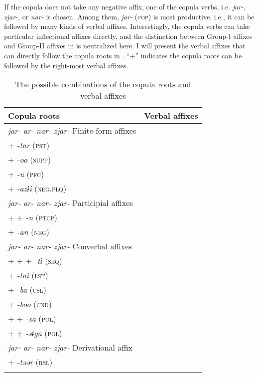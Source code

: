   If the copula does not take any negative affix, one of the copula verbs, i.e. \textit{jar-}, \textit{zjar-}, or \textit{nar-} is chosen. Among them, \textit{jar-} (\textsc{cop}) is most productive, i.e., it can be followed by many kinds of verbal affixes. Interestingly, the copula verbs can take particular inflectional affixes directly, and the distinction between Group-I affixes and Group-II affixes in  is neutralized here. I will present the verbal affixes that can directly follow the copula roots in . “+” indicates the copula roots can be followed by the right-most verbal affixes.

\begin{table}
\caption{\label{tab:key:75}The possible combinations of the copula roots and verbal affixes}
\begin{tabular}{ll}
\lsptoprule
Copula roots &  Verbal affixes\\
\midrule
\textit{jar-}  \textit{ar-}  \textit{nar-}  \textit{zjar-}  Finite-form affixes      \\
+        \textit{-tar} (\textsc{pst})                                                \\
+        \textit{-oo} (\textsc{supp})                                                \\
  +      \textit{-u} (\textsc{pfc})                                                  \\
  +      \textit{-azɨi} (\textsc{neg}.\textsc{plq})                                  \\
\textit{jar-}  \textit{ar-}  \textit{nar-}  \textit{zjar-}  Participial affixes      \\
+      +  \textit{-n} (\textsc{ptcp})                                                \\
  +      \textit{-an} (\textsc{neg})                                                 \\
\textit{jar-}  \textit{ar-}  \textit{nar-}  \textit{zjar-}  Converbal affixes        \\
+  +  +    \textit{-tɨ} (\textsc{seq})                                               \\
+        \textit{-tai} (\textsc{lst})                                                \\
+        \textit{-ba} (\textsc{csl})                                                 \\
+        \textit{-boo} (\textsc{cnd})                                                \\
+      +  \textit{-sa} (\textsc{pol})                                                \\
+      +  \textit{-sɨga} (\textsc{pol})                                              \\
\textit{jar-}  \textit{ar-}  \textit{nar-}  \textit{zjar-}  Derivational affix       \\
+        \textit{-təər} (\textsc{rsl})                                               \\
\lspbottomrule
\end{tabular}
\end{table}


